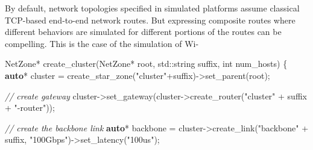 \documentclass[
]{article}
\newenvironment{Shaded}{}{}
\newcommand{\BuiltInTok}[1]{\textcolor[rgb]{0.00,0.50,0.00}{#1}}
\newcommand{\CommentTok}[1]{\textcolor[rgb]{0.38,0.63,0.69}{\textit{#1}}}
\newcommand{\DataTypeTok}[1]{\textcolor[rgb]{0.56,0.13,0.00}{#1}}
\newcommand{\KeywordTok}[1]{\textcolor[rgb]{0.00,0.44,0.13}{\textbf{#1}}}
\newcommand{\NormalTok}[1]{#1}
\newcommand{\OperatorTok}[1]{\textcolor[rgb]{0.40,0.40,0.40}{#1}}
\newcommand{\StringTok}[1]{\textcolor[rgb]{0.25,0.44,0.63}{#1}}
\begin{document}
By default, network topologies specified in simulated platforms assume
classical TCP-based end-to-end network routes. But expressing composite
routes where different behaviors are simulated for different portions of
the routes can be compelling. This is the case of the simulation of Wi-

\begin{Shaded}
\begin{Highlighting}[]
\NormalTok{NetZone}\OperatorTok{*}\NormalTok{ create\_cluster}\OperatorTok{(}\NormalTok{NetZone}\OperatorTok{*}\NormalTok{ root}\OperatorTok{,} \BuiltInTok{std::}\NormalTok{string suffix}\OperatorTok{,} \DataTypeTok{int}\NormalTok{ num\_hosts}\OperatorTok{)} \OperatorTok{\{}
    \KeywordTok{auto}\OperatorTok{*}\NormalTok{ cluster }\OperatorTok{=}\NormalTok{ create\_star\_zone}\OperatorTok{(}\StringTok{"cluster"}\OperatorTok{+}\NormalTok{suffix}\OperatorTok{){-}\textgreater{}}\NormalTok{set\_parent}\OperatorTok{(}\NormalTok{root}\OperatorTok{);}

    \CommentTok{// create gateway}
\NormalTok{    cluster}\OperatorTok{{-}\textgreater{}}\NormalTok{set\_gateway}\OperatorTok{(}\NormalTok{cluster}\OperatorTok{{-}\textgreater{}}\NormalTok{create\_router}\OperatorTok{(}\StringTok{"cluster"} \OperatorTok{+}\NormalTok{ suffix }\OperatorTok{+} \StringTok{"{-}router"}\OperatorTok{));}

    \CommentTok{// create the backbone link}
    \KeywordTok{auto}\OperatorTok{*}\NormalTok{ backbone }\OperatorTok{=}\NormalTok{ cluster}\OperatorTok{{-}\textgreater{}}\NormalTok{create\_link}\OperatorTok{(}\StringTok{"backbone"} \OperatorTok{+}\NormalTok{ suffix}\OperatorTok{,} \StringTok{"100Gbps"}\OperatorTok{){-}\textgreater{}}\NormalTok{set\_latency}\OperatorTok{(}\StringTok{"100us"}\OperatorTok{);}


\end{Highlighting}
\end{Shaded}
\end{document}
